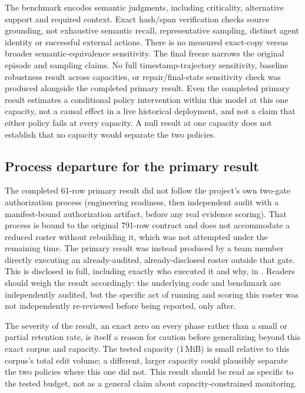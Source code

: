 \documentclass[11pt]{article}
\newcommand{\repo}[1]{{\small\path{#1}}}
\begin{document}
The benchmark encodes semantic judgments, including criticality, alternative support and required context. Exact hash/span verification checks source grounding, not exhaustive semantic recall, representative sampling, distinct agent identity or successful external actions. There is no measured exact-copy versus broader semantic-equivalence sensitivity. The final freeze narrows the original episode and sampling claims. No full timestamp-trajectory sensitivity, baseline robustness result across capacities, or repair/final-state sensitivity check was produced alongside the completed primary result. Even the completed primary result estimates a conditional policy intervention within this model at this one capacity, not a causal effect in a live historical deployment, and not a claim that either policy fails at every capacity. A null result at one capacity does not establish that no capacity would separate the two policies.

\subsection*{Process departure for the primary result}
The completed 61-row primary result did not follow the project's own two-gate authorization process (engineering readiness, then independent audit with a manifest-bound authorization artifact, before any real evidence scoring). That process is bound to the original 791-row contract and does not accommodate a reduced roster without rebuilding it, which was not attempted under the remaining time. The primary result was instead produced by a team member directly executing an already-audited, already-disclosed roster outside that gate. This is disclosed in full, including exactly who executed it and why, in \repo{runs/PRIMARY\_SCOPED\_v1/PRIMARY\_RESULT.md}. Readers should weigh the result accordingly: the underlying code and benchmark are independently audited, but the specific act of running and scoring this roster was not independently re-reviewed before being reported, only after.

The severity of the result, an exact zero on every phase rather than a small or partial retention rate, is itself a reason for caution before generalizing beyond this exact corpus and capacity. The tested capacity (1\,MiB) is small relative to this corpus's total edit volume; a different, larger capacity could plausibly separate the two policies where this one did not. This result should be read as specific to the tested budget, not as a general claim about capacity-constrained monitoring.
\end{document}
